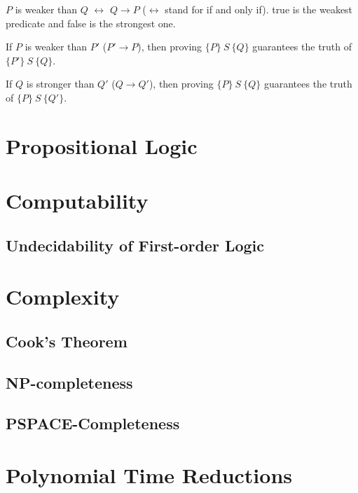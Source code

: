 \documentclass[a4paper,11pt]{report}
\newcommand{\HTriple}[3]{\{#1\}\ #2 \ \{#3\}}
\begin{document}
$P$ is weaker than $Q$ $\leftrightarrow$ $Q \to P$ ($\leftrightarrow$ stand for
if and only if). true is the weakest predicate and false is the strongest one.

If $P$ is weaker than $P'$ ($P' \to P$), then proving $\HTriple{P}{S}{Q}$
guarantees the truth of $\HTriple{P'}{S}{Q}$.

If $Q$ is stronger than $Q'$ ($Q \to Q'$), then proving $\HTriple{P}{S}{Q}$
guarantees the truth of $\HTriple{P}{S}{Q'}$.


\chapter{Propositional Logic}
\chapter{Computability}
\section{Undecidability of First-order Logic}
\chapter{Complexity}
\section{Cook's Theorem}
\section{NP-completeness}
\section{PSPACE-Completeness}
\chapter{Polynomial Time Reductions}
\end{document}
